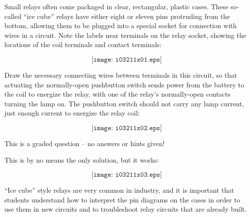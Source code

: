 

Small relays often come packaged in clear, rectangular, plastic cases.  These so-called ``ice cube'' relays have either eight or eleven pins protruding from the bottom, allowing them to be plugged into a special socket for connection with wires in a circuit.  Note the labels near terminals on the relay socket, showing the locations of the coil terminals and contact terminals:

$$\texttt{[image: i03211x01.eps]}$$

Draw the necessary connecting wires between terminals in this circuit, so that actuating the normally-open pushbutton switch sends power from the battery to the coil to energize the relay, with one of the relay's normally-open contacts turning the lamp on.  The pushbutton switch should not carry any lamp current, just enough current to energize the relay coil:

\vskip 20pt

$$\texttt{[image: i03211x02.eps]}$$

\vfil 

\eject






This is a graded question -- no answers or hints given!
 






This is by no means the only solution, but it works:

$$\texttt{[image: i03211x03.eps]}$$

``Ice cube'' style relays are very common in industry, and it is important that students understand how to interpret the pin diagrams on the cases in order to use them in new circuits and to troubleshoot relay circuits that are already built.




